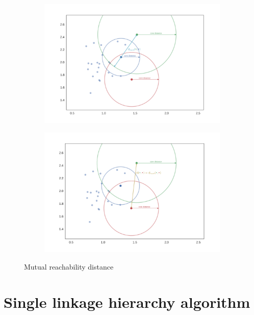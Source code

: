 \documentclass{article}
\begin{document}
	\begin{figure}[h!]
		\begin{subfigure}{.5\textwidth}
			\centering
			\includegraphics[width=\linewidth]{dis_figure1.png}
			\caption{}
		\end{subfigure}%
		\begin{subfigure}{.5\textwidth}
			\centering
			\includegraphics[width=\linewidth]{dis_figure2.png}
			\caption{}
		\end{subfigure}
		\caption{Mutual reachability distance}
	\end{figure}
	
	\section{Single linkage hierarchy algorithm}
	
\end{document}
